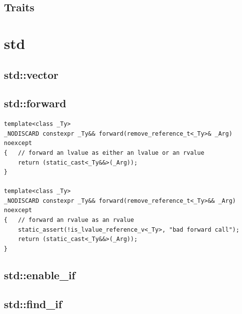 \documentclass[12pt]{book}
\begin{document}
\subsection{Traits}
\section{std}
\subsection{std::vector}
\subsection{std::forward}
\begin{lstlisting}
template<class _Ty>
_NODISCARD constexpr _Ty&& forward(remove_reference_t<_Ty>& _Arg) noexcept
{	// forward an lvalue as either an lvalue or an rvalue
	return (static_cast<_Ty&&>(_Arg));
}

template<class _Ty>
_NODISCARD constexpr _Ty&& forward(remove_reference_t<_Ty>&& _Arg) noexcept
{	// forward an rvalue as an rvalue
	static_assert(!is_lvalue_reference_v<_Ty>, "bad forward call");
	return (static_cast<_Ty&&>(_Arg));
}
\end{lstlisting}

\subsection{std::enable\_if}
\subsection{std::find\_if}
\end{document}
